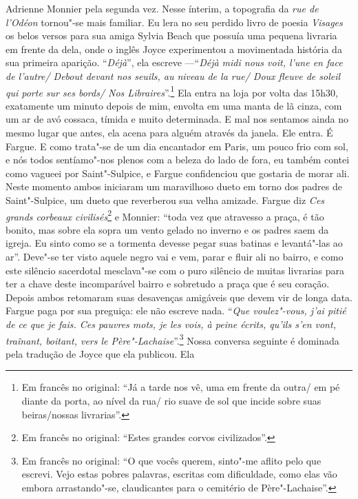Adrienne Monnier pela segunda vez. Nesse ínterim,
a topografia da \emph{rue de l'Odéon} tornou"-se mais familiar. Eu lera
no seu perdido livro de poesia \emph{Visages} os belos versos para sua
amiga Sylvia Beach que possuía uma pequena livraria em frente da dela,
onde o inglês Joyce experimentou a movimentada história da sua primeira
aparição. ``\emph{Déjà}'', ela escreve ---``\emph{Déjà midi nous voit,
l'une en face de l'autre/ Debout devant nos seuils, au niveau de la rue/ Doux fleuve de soleil qui porte sur ses bords/ Nos
Libraires}''.\footnote{Em francês no original: ``Já a tarde nos vê, uma em frente da outra/
  em pé diante da porta, ao nível da rua/ rio suave de sol que incide
  sobre suas beiras/nossas livrarias''. \versal{[N.~T.]}} Ela
entra na loja por volta das 15h30, exatamente um minuto depois de mim,
envolta em uma manta de lã cinza, com um ar de avó cossaca, tímida e
muito determinada. E mal nos sentamos ainda no mesmo lugar que antes,
ela acena para alguém através da janela. Ele entra. É Fargue. E como
trata"-se de um dia encantador em Paris, um pouco frio com sol, e nós
todos sentíamo"-nos plenos com a beleza do lado de fora, eu também
contei como vagueei por Saint"-Sulpice, e Fargue confidenciou que
gostaria de morar ali. Neste momento ambos iniciaram um maravilhoso
dueto em torno dos padres de Saint"-Sulpice, um dueto que reverberou sua
velha amizade. Fargue diz \emph{Ces grands corbeaux civilisés}\footnote{Em francês no original:
  ``Estes grandes corvos civilizados''. \versal{[N.~T.]}} e
Monnier: ``toda vez que atravesso a praça, é tão bonito, mas sobre ela
sopra um vento gelado no inverno e os padres saem da igreja. Eu sinto
como se a tormenta devesse pegar suas batinas e levantá"-las ao ar''.
Deve"-se ter visto aquele negro vai e vem, parar e fluir ali no bairro, e
como este silêncio sacerdotal mesclava"-se com o puro silêncio de muitas
livrarias para ter a chave deste incomparável bairro e sobretudo a praça
que é seu coração. Depois ambos retomaram suas desavenças amigáveis que
devem vir de longa data. Fargue paga por sua preguiça: ele não escreve
nada. ``\emph{Que voulez"-vous, j'ai pitié de ce que je fais. Ces pauvres
mots, je les vois, à peine écrits, qu'ils s'en vont, traînant, boitant,
vers le Père"-Lachaise}''.\footnote{Em francês no original: ``O que vocês querem, sinto"-me
  aflito pelo que escrevi. Vejo estas pobres palavras, escritas com
  dificuldade, como elas vão embora arrastando"-se, claudicantes para o
  cemitério de Père"-Lachaise''. \versal{[N.~T.]}} Nossa conversa
seguinte é dominada pela tradução de Joyce que ela publicou. Ela
